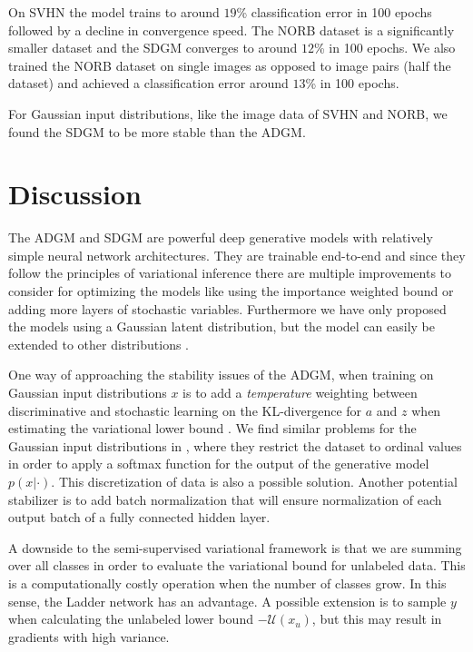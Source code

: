 \documentclass{article}
\begin{document}
On SVHN the model trains to around $19$\% classification error in 100 epochs followed by a decline in convergence speed. The NORB dataset is a significantly smaller dataset and the SDGM converges to around $12$\% in 100 epochs. We also trained the NORB dataset on single images as opposed to image pairs (half the dataset) and achieved a classification error around $13$\% in 100 epochs.

For Gaussian input distributions, like the image data of SVHN and NORB, we found the SDGM to be more stable than the ADGM.

\section{Discussion}
The ADGM and SDGM are powerful deep generative models with relatively simple neural network architectures. They are trainable end-to-end and since they follow the principles of variational inference there are multiple improvements to consider for optimizing the models like using the importance weighted bound or adding more layers of stochastic variables. Furthermore we have only proposed the models using a Gaussian latent distribution, but the model can easily be extended to other distributions \citep{Ranganath2014, Ranganath2015}.

One way of approaching the stability issues of the ADGM, when training on Gaussian input distributions $x$ is to add a \emph{temperature} weighting between discriminative and stochastic learning on the KL-divergence for $a$ and $z$ when estimating the variational lower bound \cite{Sonderby2016}. We find similar problems for the Gaussian input distributions in \citet{Oord2015}, where they restrict the dataset to ordinal values in order to apply a softmax function for the output of the generative model $p(x|\cdot)$. This discretization of data is also a possible solution. Another potential stabilizer is to add batch normalization \cite{Ioffe2015} that will ensure normalization of each output batch of a fully connected hidden layer. 

A downside to the semi-supervised variational framework is that we are summing over all classes in order to evaluate the variational bound for unlabeled data. This is a computationally costly operation when the number of classes grow. In this sense, the Ladder network has an advantage. A possible extension is to sample $y$ when calculating the unlabeled lower bound $-\mathcal{U}(x_u)$, but this may result in gradients with high variance.
\end{document}
